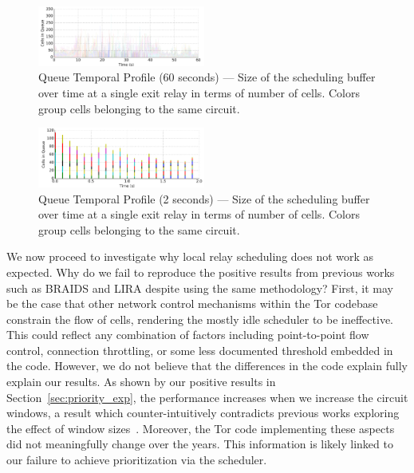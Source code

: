 \begin{figure} \centering
  \includegraphics[width=0.49\textwidth]{images/scheduling_far.png}
  \caption[Queue Temporal Profile (60 seconds)]{Queue Temporal Profile (60
    seconds) --- Size of the scheduling buffer over time at a single exit relay
    in terms of number of cells. Colors group cells belonging to the same
    circuit.}
  \label{fig:scheduling_far}
\end{figure}

\begin{figure} \centering
  \includegraphics[width=0.49\textwidth]{images/scheduling_close.png}
  \caption[Queue Temporal Profile (2 seconds)]{Queue Temporal Profile (2
    seconds) --- Size of the scheduling buffer over time at a single exit relay
    in terms of number of cells. Colors group cells belonging to the same
    circuit.}
  \label{fig:scheduling_close}
\end{figure}


We now proceed to investigate why local relay scheduling does not work as expected.
Why do we fail to reproduce the positive results from previous works such as BRAIDS and LIRA despite using the same methodology?
First, it may be the case that other network control mechanisms within the Tor codebase constrain the flow of cells, rendering the mostly idle scheduler to be ineffective.
This could reflect any combination of factors including point-to-point flow control, connection throttling, or some less documented threshold embedded in the code.
However, we do not believe that the differences in the code explain fully explain our results.
As shown by our positive results in Section~\ref{sec:priority_exp}, the performance increases when we increase the circuit windows, a result which counter-intuitively contradicts previous works exploring the effect of window sizes~\cite{archive-2009-mail, kiraly2008solving, dingledine2009performance}.
Moreover, the Tor code implementing these aspects did not meaningfully change over the years.
This information is likely linked to our failure to achieve prioritization via the scheduler.

